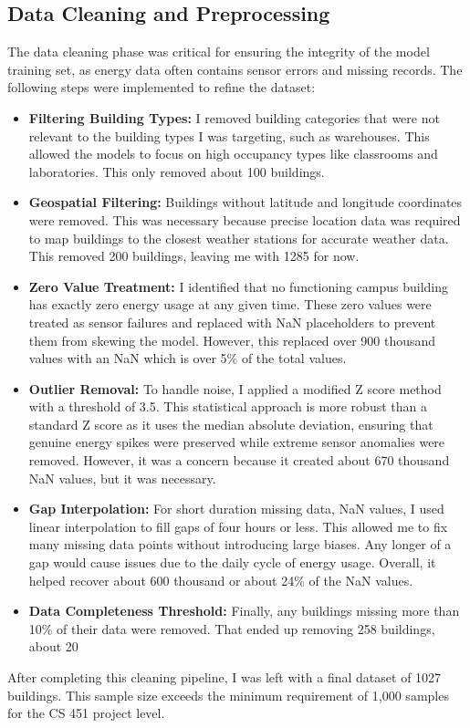 \documentclass[conference]{IEEEtran}
\begin{document}
\subsection{Data Cleaning and Preprocessing}
The data cleaning phase was critical for ensuring the integrity of the model training set, as energy data often contains sensor errors and missing records. The following steps were implemented to refine the dataset: 
\begin{itemize} 
\item \textbf{Filtering Building Types:} I removed building categories that were not relevant to the building types I was targeting, such as warehouses. This allowed the models to focus on high occupancy types like classrooms and laboratories. This only removed about 100 buildings.
 \item \textbf{Geospatial Filtering:} Buildings without latitude and longitude coordinates were removed. This was necessary because precise location data was required to map buildings to the closest weather stations for accurate weather data. This removed 200 buildings, leaving me with 1285 for now.
 \item \textbf{Zero Value Treatment:} I identified that no functioning campus building has exactly zero energy usage at any given time. These zero values were treated as sensor failures and replaced with NaN placeholders to prevent them from skewing the model. However, this replaced over 900 thousand values with an NaN which is over 5\% of the total values.
\item \textbf{Outlier Removal:} To handle noise, I applied a modified Z score method with a threshold of 3.5. This statistical approach is more robust than a standard Z score as it uses the median absolute deviation, ensuring that genuine energy spikes were preserved while extreme sensor anomalies were removed. However, it was a concern because it created about 670 thousand NaN values, but it was necessary.
 \item \textbf{Gap Interpolation:} For short duration missing data, NaN values, I used linear interpolation to fill gaps of four hours or less. This allowed me to fix many missing data points without introducing large biases. Any longer of a gap would cause issues due to the daily cycle of energy usage. Overall, it helped recover about 600 thousand or about 24\% of the NaN values.
 \item \textbf{Data Completeness Threshold:} Finally, any buildings missing more than 10\% of their data were removed. That ended up removing 258 buildings, about 20%
\end{itemize} 
After completing this cleaning pipeline, I was left with a final dataset of 1027 buildings. This sample size exceeds the minimum requirement of 1,000 samples for the CS 451 project level. 
\end{document}
